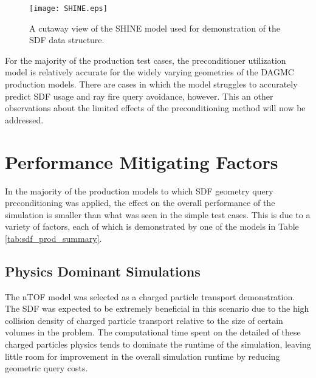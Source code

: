\begin{figure}
\centering
\texttt{[image: SHINE.eps]}
\caption{A cutaway view of the SHINE model used for demonstration of the SDF
  data structure.}
\label{fig:shine_sdf}
\end{figure}

For the majority of the production test cases, the preconditioner utilization
model is relatively accurate for the widely varying geometries of the DAGMC
production models.  There are cases in which the model struggles to accurately
predict SDF usage and ray fire query avoidance, however. This an other
observations about the limited effects of the preconditioning method will now be
addressed.


\section{Performance Mitigating Factors}\label{sec:sdf_limitations}

In the majority of the production models to which SDF geometry query
preconditioning was applied, the effect on the overall performance of the
simulation is smaller than what was seen in the simple test cases. This is
due to a variety of factors, each of which is demonstrated by one of the models
in Table \ref{tab:sdf_prod_summary}.

\subsection{Physics Dominant Simulations}\label{subsec:sdf_phys_dominant}

The nTOF model was selected as a charged particle transport demonstration. The
SDF was expected to be extremely beneficial in this scenario due to the high
collision density of charged particle transport relative to the size of certain
volumes in the problem. The computational time spent on the detailed of these
charged particles physics tends to dominate the runtime of the simulation,
leaving little room for improvement in the overall simulation runtime by
reducing geometric query costs.

